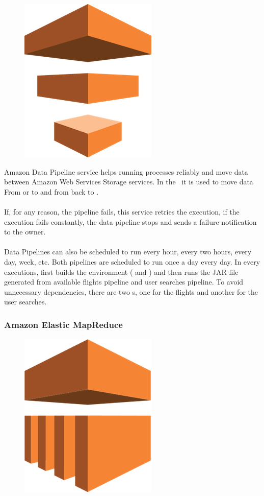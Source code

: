 \begin{figure}[H]
\includegraphics[scale=0.1]{resources/data_pipeline-logo.png}
\end{figure}

Amazon Data Pipeline\cite{data_pipeline} service helps running processes reliably and move data between Amazon Web Services Storage services. In the \thesis\ it is used to move data From  or  to  and from  back to .
\\\\
If, for any reason, the pipeline fails, this service retries the execution, if the execution fails constantly, the data pipeline stops and sends a failure notification to the owner.
\\\\
Data Pipelines can also be scheduled to run every hour, every two hours, every day, week, etc. Both pipelines are scheduled to run once a day every day. In every executions, first builds the environment ( and ) and then runs the JAR\cite{jar} file generated from available flights pipeline and user searches pipeline. To avoid unnecessary dependencies, there are two s, one for the flights and another for the user searches.

\subsubsection*{Amazon Elastic MapReduce} \label{emr}

\begin{figure}[H]
\includegraphics[scale=0.1]{resources/emr-logo.png}
\end{figure}

